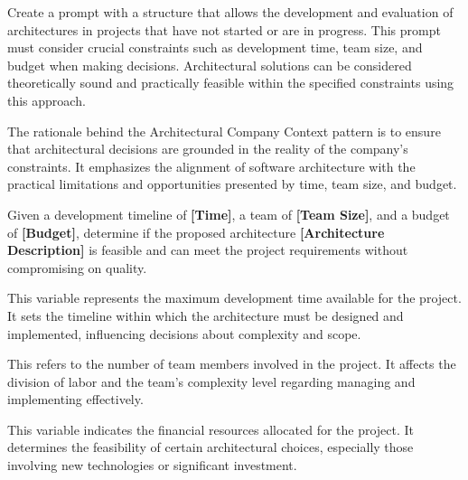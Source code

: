 

Create a prompt with a structure that allows the development and evaluation of architectures in projects that have not started or are in progress. This prompt must consider crucial constraints such as development time, team size, and budget when making decisions. Architectural solutions can be considered theoretically sound and practically feasible within the specified constraints using this approach.

 The rationale behind the Architectural Company Context pattern is to ensure that architectural decisions are grounded in the reality of the company's constraints. It emphasizes the alignment of software architecture with the practical limitations and opportunities presented by time, team size, and budget.
 

 Given a development timeline of \textcolor{mycolorgreen}{\textbf{[Time]}}, a team of \textcolor{mycolorblue}{\textbf{[Team Size]}}, and a budget of \textcolor{mycolorpink}{\textbf{[Budget]}}, determine if the proposed architecture \textcolor{mycolororange}{\textbf{[Architecture Description]}} is feasible and can meet the project requirements without compromising on quality.

\MyParaBold{\textcolor{mycolorgreen}{[Time]:}}This variable represents the maximum development time available for the project. It sets the timeline within which the architecture must be designed and implemented, influencing decisions about complexity and scope. 

\MyParaBold{\textcolor{mycolorblue}{[Team Size]:}}This refers to the number of team members involved in the project. It affects the division of labor and the team's complexity level regarding managing and implementing effectively. 

\MyParaBold{\textcolor{mycolorpink}{[Budget]:}}This variable indicates the financial resources allocated for the project. It determines the feasibility of certain architectural choices, especially those involving new technologies or significant investment. 

